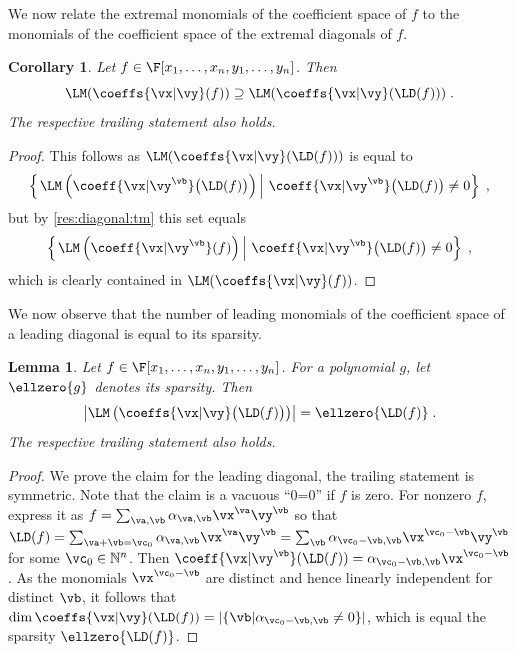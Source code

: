 \documentclass[11pt]{article}
\numberwithin{equation}{section}
\newtheorem{lemma}[theorem]{Lemma}
\newtheorem{corollary}[theorem]{Corollary}
\theoremstyle{definition}
\theoremstyle{plain}
\newcommand{\N}{\mathbb N}
\begin{document}
We now relate the extremal monomials of the coefficient space of $f$ to the monomials of the coefficient space of the extremal diagonals of $f$.

\begin{corollary}\label{res:diagonal:lm-coeffs}
        Let $f\in\F[x_1,\ldots,x_n,y_1,\ldots,y_n]$.  Then
        \[
                \LM(\coeffs{\vx|\vy}(f))\supseteq \LM(\coeffs{\vx|\vy}(\LD(f)))
                \;.
        \]
        The respective trailing statement also holds.
\end{corollary}
\begin{proof}
        This follows as $\LM(\coeffs{\vx|\vy}(\LD(f)))$ is equal to
        \[
                \left\{\left.\LM\left(\coeff{\vx|\vy^\vb}\big(\LD(f)\big)\right) \, \right|\,  \coeff{\vx|\vy^\vb}\big(\LD(f)\big)\ne 0\right\}
                \;,
        \]
        but by \autoref{res:diagonal:tm} this set equals
        \[
                \left\{\left.\LM\left(\coeff{\vx|\vy^\vb}(f)\right) \, \right|\,  \coeff{\vx|\vy^\vb}\big(\LD(f)\big)\ne 0\right\}
                \;,
        \]
        which is clearly contained in $\LM(\coeffs{\vx|\vy}(f))$.
\end{proof}

We now observe that the number of leading monomials of the coefficient space of a leading diagonal is equal to its sparsity.

\begin{lemma}\label{lem:LM-by-LD}
        Let $f\in\F[x_1,\ldots,x_n,y_1,\ldots,y_n]$. For a polynomial $g$, let $\ellzero{g}$ denotes its sparsity. Then
        \[
                \left|\LM\left(\coeffs{\vx|\vy}\big(\LD(f)\big)\right)\right|
                =\ellzero{\LD(f)}
                \;.
        \]
        The respective trailing statement also holds.
\end{lemma}
\begin{proof}
        We prove the claim for the leading diagonal, the trailing statement is symmetric. Note that the claim is a vacuous ``0=0'' if $f$ is zero.  For nonzero $f$, express it as $f=\sum_{\va,\vb} \alpha_{\va,\vb}\vx^\va\vy^\vb$ so that $\LD(f)=\sum_{\va+\vb=\vc_0}\alpha_{\va,\vb}\vx^\va\vy^\vb=\sum_{\vb}\alpha_{\vc_0-\vb,\vb}\vx^{\vc_0-\vb}\vy^\vb$ for some $\vc_0\in\N^n$.  Then $\coeff{\vx|\vy^\vb}(\LD(f))=\alpha_{\vc_0-\vb,\vb}\vx^{\vc_0-\vb}$.  As the monomials $\vx^{\vc_0-\vb}$ are distinct and hence linearly independent for distinct $\vb$, it follows that $\dim\coeffs{\vx|\vy}(\LD(f))=|\{\vb| \alpha_{\vc_0-\vb,\vb}\ne 0\}|$, which is equal the sparsity $\ellzero{\LD(f)}$.
\end{proof}
\end{document}
